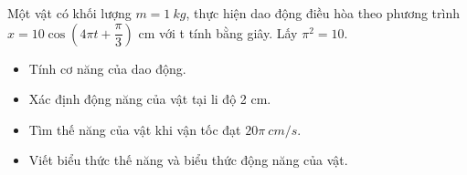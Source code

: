 \begin{vidu}
Một vật có khối lượng $m=1\ kg$, thực hiện dao động điều hòa theo phương trình $x=10\cos\left({4\pi t+\dfrac{\pi}{3}}\right)$ cm với t tính bằng giây. Lấy $\pi^2=10$.
\begin{itemize}
\item [1.] Tính cơ năng của dao động.
\item [2.] Xác định động năng của vật tại li độ 2 cm.
\item [3.] Tìm thế năng của vật khi vận tốc đạt $20\pi\ cm/s$.
\item [4.] Viết biểu thức thế năng và biểu thức động năng của vật.
\end{itemize}
\end{vidu} %
